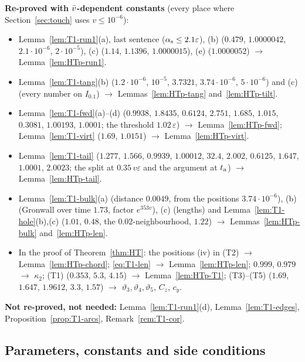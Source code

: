 \medskip\noindent\textbf{Re-proved with $\bar v$-dependent constants} (every place where Section~\ref{sec:touch} uses $v\le10^{-6}$):
\begin{itemize}
\item Lemma~\ref{lem:T1-run1}(a), last sentence ($\alpha_{\mathrm s}\le2.1\varepsilon$), (b) ($0.479$, $1.0000042$, $2.1\cdot10^{-6}$,
$2\cdot10^{-5}$), (c) ($1.14$, $1.1396$, $1.0000015$), (e) ($1.0000052$) $\to$ Lemma~\ref{lem:HTp-run1}.
\item Lemma~\ref{lem:T1-tang}(b) ($1.2\cdot10^{-6}$, $10^{-5}$, $3.7321$, $3.74\cdot10^{-6}$, $5\cdot10^{-6}$) and (c) (every number on
$I_{0.1}$) $\to$ Lemmas~\ref{lem:HTp-tang} and~\ref{lem:HTp-tilt}.
\item Lemma~\ref{lem:T1-fwd}(a)--(d) ($0.9938$, $1.8435$, $0.6124$, $2.751$, $1.685$, $1.015$, $0.3081$, $1.00193$, $1.0001$; the threshold
$1.02\,\varepsilon$) $\to$ Lemma~\ref{lem:HTp-fwd}; Lemma~\ref{lem:T1-virt} ($1.69$, $1.0151$) $\to$ Lemma~\ref{lem:HTp-virt}.
\item Lemma~\ref{lem:T1-tail} ($1.277$, $1.566$, $0.9939$, $1.00012$, $32.4$, $2.002$, $0.6125$, $1.647$, $1.0001$, $2.0023$; the split at
$0.35\,v\varepsilon$ and the argument at $t_{\mathrm a}$) $\to$ Lemma~\ref{lem:HTp-tail}.
\item Lemma~\ref{lem:T1-bulk}(a) (distance $0.0049$, from the positions $3.74\cdot10^{-6}$), (b) (Gronwall over time $1.73$, factor
$e^{353v}$), (c) (lengths) and Lemma~\ref{lem:T1-hole}(b),(c) ($1.01$, $0.48$, the $0.02$-neighbourhood, $1.22$) $\to$
Lemmas~\ref{lem:HTp-bulk} and~\ref{lem:HTp-len}.
\item In the proof of Theorem~\ref{thm:HT}: the positions (iv) in \textup{(T2)} $\to$ Lemma~\ref{lem:HTp-chord}; \eqref{eq:T1-len}
$\to$ Lemma~\ref{lem:HTp-len}; $0.999$, $0.979$ $\to$ $\kappa_2$; \textup{(T1)} ($0.353$, $5.3$, $4.15$) $\to$
Lemma~\ref{lem:HTp-T1}; \textup{(T3)}--\textup{(T5)} ($1.69$, $1.647$, $1.9612$, $3.3$, $1.57$) $\to$ $\vartheta_3,\vartheta_4,\vartheta_5$,
$C_z$, $c_y$.
\end{itemize}
\textbf{Not re-proved, not needed:} Lemma~\ref{lem:T1-run1}(d), Lemma~\ref{lem:T1-edges}, Proposition~\ref{prop:T1-arcs},
Remark~\ref{rem:T1-cor}.

\subsection{Parameters, constants and side conditions}\label{sec:HTp-const}

